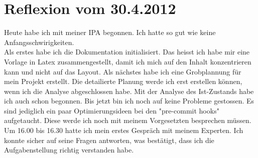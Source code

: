 \section{Reflexion vom 30.4.2012}

Heute habe ich mit meiner IPA begonnen. Ich hatte so gut wie keine Anfangsschwirigkeiten. \\
Als erstes habe ich die Dokumentation initialisiert. Das heisst ich habe mir eine Vorlage in Latex zusammengestellt, damit ich mich auf den Inhalt konzentrieren kann und nicht auf das Layout.
Als nächstes habe ich eine Grobplannung für mein Projekt erstellt. Die detailierte Planung werde ich erst erstellen können, wenn ich die Analyse abgeschlossen habe.
Mit der Analyse des Ist-Zustands habe ich auch schon begonnen. Bis jetzt bin ich noch auf keine Probleme gestossen. Es sind jediglich ein paar Optimierungsideen bei den "pre-commit hooks" aufgetaucht. Diese werde ich noch mit meinem Vorgesetzten besprechen müssen. \\ 
Um 16.00 bis 16.30 hatte ich mein erstes Gespräch mit meinem Experten. Ich konnte sicher auf seine Fragen antworten, was bestätigt, dass ich die Aufgabenstellung richtig verstanden habe. 
